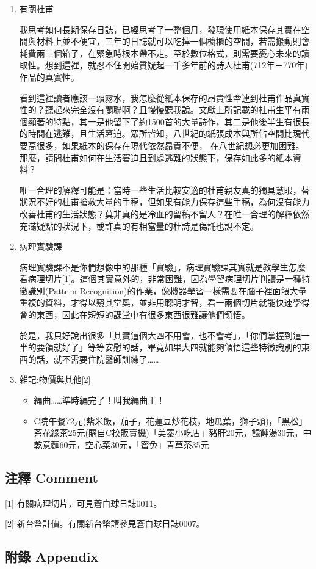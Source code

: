 \documentclass[a5paper, 12pt
]{book}
\providecommand{\tightlist}{%
  \setlength{\itemsep}{0pt}\setlength{\parskip}{0pt}}
\begin{document}
\begin{enumerate}
\def\labelenumi{\arabic{enumi}.}
\item
  有關杜甫

  我思考如何長期保存日誌，已經思考了一整個月，發現使用紙本保存其實在空間與材料上並不便宜，三年的日誌就可以吃掉一個櫥櫃的空間，若需搬動則會耗費兩三個箱子，在緊急時根本帶不走。至於數位格式，則需要憂心未來的讀取性。想到這裡，就忍不住開始質疑起一千多年前的詩人杜甫(712年－770年)作品的真實性。

  看到這裡讀者應該一頭霧水，我怎麼從紙本保存的昂貴性牽連到杜甫作品真實性的？聽起來完全沒有關聯啊？且慢慢聽我說。文獻上所記載的杜甫生平有兩個顯著的特點，其一是他留下了約1500首的大量詩作，其二是他後半生有很長的時間在逃難，且生活窘迫。眾所皆知，八世紀的紙張成本與所佔空間比現代要高很多，如果紙本的保存在現代依然昂貴不便，
  在八世紀想必更加困難。那麼，請問杜甫如何在生活窘迫且到處逃難的狀態下，保存如此多的紙本資料？

  唯一合理的解釋可能是：當時一些生活比較安適的杜甫親友真的獨具慧眼，替狀況不好的杜甫搶救大量的手稿，但如果有能力保存這些手稿，為何沒有能力改善杜甫的生活狀態？莫非真的是冷血的留稿不留人？在唯一合理的解釋依然充滿疑點的狀況下，或許真的有相當量的杜詩是偽託也說不定。
\item
  病理實驗課

  病理實驗課不是你們想像中的那種「實驗」，病理實驗課其實就是教學生怎麼看病理切片{[}1{]}。這個其實意外的，非常困難，因為學習病理切片判讀是一種特徵識別(Pattern
  Recognition)的作業，像機器學習一樣需要在腦子裡面餵大量重複的資料，才得以窺其堂奧，並非用聰明才智，看一兩個切片就能快速學得會的東西，因此在短短的課堂中有很多東西很難讓他們領悟。

  於是，我只好說出很多「其實這個大四不用會，也不會考」，「你們掌握到這一半的要領就好了」等等安慰的話，畢竟如果大四就能夠領悟這些特徵識別的東西的話，就不需要住院醫師訓練了\ldots\ldots{}
\item
  雜記:物價與其他{[}2{]}

  \begin{itemize}
  \tightlist
  \item
    編曲\ldots\ldots 準時編完了！叫我編曲王！
  \item
    C院午餐72元(紫米飯，茄子，花蓮豆炒花枝，地瓜葉，獅子頭)，「黑松」茶花綠茶25元(購自C校販賣機)「美蓁小吃店」豬肝20元，餛飩湯30元，中乾意麵60元，空心菜30元，「蜜兔」青草茶35元
  \end{itemize}
\end{enumerate}

\hypertarget{ux6ce8ux91cb-comment-26}{%
\subsection{注釋 Comment}\label{ux6ce8ux91cb-comment-26}}

{[}1{]} 有關病理切片，可見蒼白球日誌0011。

{[}2{]} 新台幣計價。有關新台幣請參見蒼白球日誌0007。

\hypertarget{ux9644ux9304-appendix-25}{%
\subsection{附錄 Appendix}\label{ux9644ux9304-appendix-25}}
\end{document}
